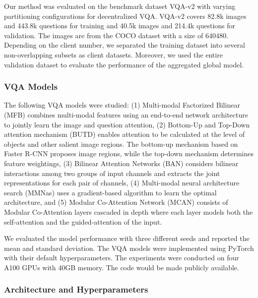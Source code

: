 \documentclass[letterpaper]{article} %
\begin{document}
Our method was evaluated on the benchmark dataset VQA-v2 \cite{vqabase} with varying partitioning configurations for decentralized VQA. 
VQA-v2 covers 82.8k images and 443.8k questions for training and 40.5k images and 214.4k questions for validation. The images are from the COCO dataset \cite{coco} with a size of 640480. Depending on the client number, we separated the training dataset into several non-overlapping subsets as client datasets. Moreover, we used the entire validation dataset to evaluate the performance of the aggregated global model.

\subsubsection{VQA Models} \label{sec:models} The following VQA models were studied: (1) Multi-modal Factorized Bilinear (MFB) \cite{mfb} combines multi-modal features using an end-to-end network architecture to jointly learn the image and question attention, (2) Bottom-Up and Top-Down attention mechanism (BUTD) \cite{butd} enables attention to be calculated at the level of objects and other salient image regions. The bottom-up mechanism based on Faster R-CNN proposes image regions, while the top-down mechanism determines feature weightings, (3) Bilinear Attention Networks (BAN) \cite{ban} considers bilinear interactions among two groups of input channels and extracts the joint representations for each pair of channels, (4) Multi-modal neural architecture search (MMNas) \cite{mmnas} uses a gradient-based algorithm to learn the optimal architecture, and (5) Modular Co-Attention Network (MCAN) \cite{mcan} consists of Modular Co-Attention layers cascaded in depth where each layer models both the self-attention and the guided-attention of the input. 

We evaluated the model performance with three different seeds and reported the mean and standard deviation. The VQA models were implemented using PyTorch with their default hyperparameters. The experiments were conducted on four A100 GPUs with 40GB memory. The code would be made publicly available. 


\subsubsection{Architecture and Hyperparameters}
\label{structure}
\end{document}
